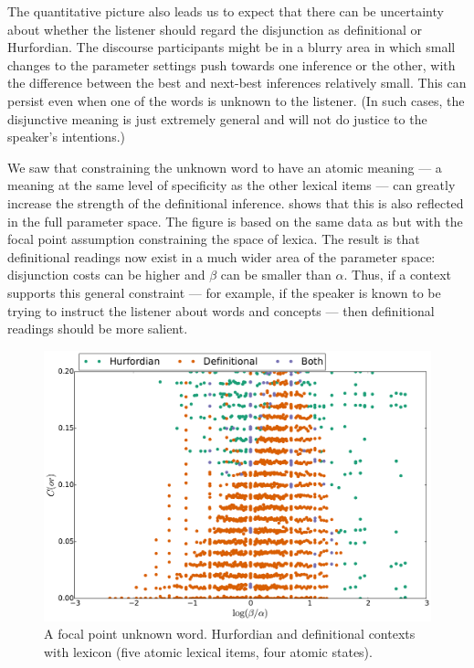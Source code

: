 \documentclass{article}
\begin{document}
The quantitative picture also leads us to expect that there can be
uncertainty about whether the listener should regard the disjunction
as definitional or Hurfordian. The discourse participants might be in
a blurry area in which small changes to the parameter settings push
towards one inference or the other, with the difference between the
best and next-best inferences relatively small. This can persist even
when one of the words is unknown to the listener. (In such cases, the
disjunctive meaning is just extremely general and will not do justice
to the speaker's intentions.)

We saw  that constraining the
unknown word to have an atomic meaning --- a meaning at the same level
of specificity as the other lexical items --- can greatly increase the
strength of the definitional inference.   shows
that this is also reflected in the full parameter space. The figure is
based on the same data as  but with the focal point
assumption constraining the space of lexica. The result is that
definitional readings now exist in a much wider area of the parameter
space: disjunction costs can be higher and $\beta$ can be smaller than
$\alpha$. Thus, if a context supports this general constraint --- for
example, if the speaker is known to be trying to instruct the listener
about words and concepts --- then definitional readings should be more
salient.

\begin{figure}[tp]
  \centering
  \includegraphics[width=1\textwidth]{fig/paramexplore-lex5-focal}
  \caption{A focal point unknown word. Hurfordian and definitional
    contexts with lexicon (five atomic lexical items, four atomic
    states).}
  \label{fig:char-focal}
\end{figure}
\end{document}
